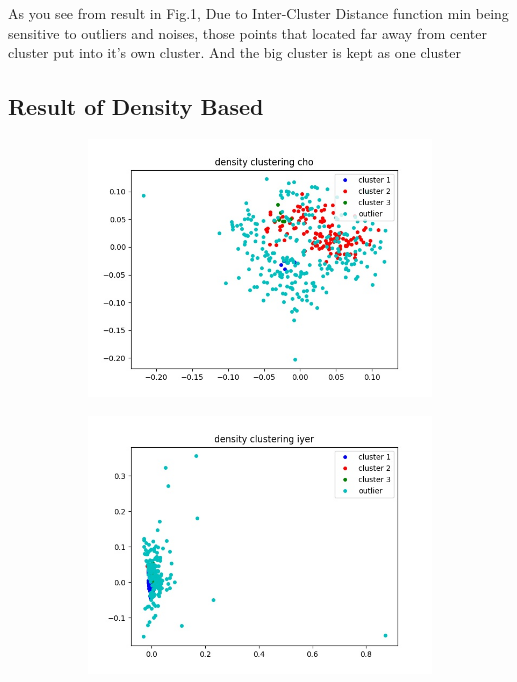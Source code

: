 \documentclass[fleqn]{llncs}
\begin{document}
As you see from result in Fig.1, Due to Inter-Cluster Distance function min being sensitive to outliers and noises, those points that located far away from center cluster put into it's own cluster. And the big cluster is kept as one cluster

\subsection{Result of Density Based}


\begin{figure}
	\centering
	\begin{subfigure}{0.45\textwidth}
		\centering
		\includegraphics[width=\textwidth]{densitycho.jpg}
		\caption{}
		\label{Fig11_1}
	\end{subfigure}
	\begin{subfigure}{0.45\textwidth}
		\centering
		\includegraphics[width=\textwidth]{densityiyer.jpg}
		\caption{}
		\label{Fig11_2}
	\end{subfigure}
	\caption{}
	\label{fig11}
\end{figure}
\end{document}
